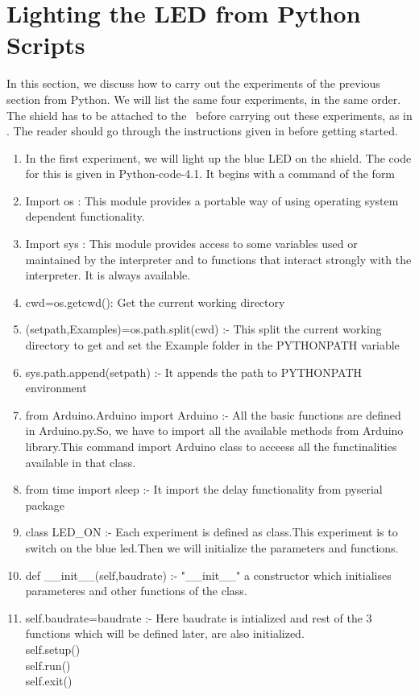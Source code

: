 \section{Lighting the LED from Python Scripts}
\label{sec:light-py}
In this section, we discuss how to carry out the experiments of the
previous section from Python.  We will list the same four experiments,
in the same order.  The shield has to be attached to the \arduino\
before carrying out these experiments, as in .
The reader should go through the instructions given in
 before getting started.
\begin{enumerate}
\item In the first experiment, we will light up the blue LED on the
  shield.  The code for this is given in Python-code-4.1.
    It begins with a command of the form
\item Import os : This module provides a portable way of using operating system dependent functionality.
\item Import sys : This module provides access to some variables used or maintained by the interpreter 
and to functions that interact strongly with the interpreter. It is always available.
\item cwd=os.getcwd(): Get the current working directory 
\item (setpath,Examples)=os.path.split(cwd) :- This split the current working directory to get and set the Example folder in the PYTHONPATH variable
\item sys.path.append(setpath) :- It appends the path to PYTHONPATH environment 
\item from Arduino.Arduino import Arduino :- All the basic functions are defined in Arduino.py.So, we have to import all the available methods from Arduino library.This command import Arduino class to acceess all the functinalities available in that class.
\item from time import sleep :- It import the delay functionality from pyserial package
\item class LED\_ON :- Each experiment is defined as class.This experiment 
is to switch on the blue led.Then we will initialize the parameters and functions.
\item def \_\_init\_\_(self,baudrate) :- "\_\_init\_\_" a constructor which initialises parameteres and other functions of the class.
\item self.baudrate=baudrate :- Here baudrate is intialized and rest of the  3 functions which will be defined later, are also initialized.\\
   self.setup() \\
   self.run()   \\
   self.exit()  \\


\end{enumerate}
